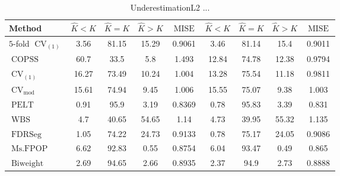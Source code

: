 \begin{table}[ht]
\centering
\begin{tabular}{|l|cccc|cccc|}
  \hline
Method & $\hat{K} < K$ & $\hat{K} = K$ & $\hat{K} > K$ & $\operatorname{MISE}$ & $\hat{K} < K$ & $\hat{K} = K$ & $\hat{K} > K$ & $\operatorname{MISE}$ \\ 
  \hline
$5$-fold $\operatorname{CV}_{(1)}$ &  3.56 & 81.15 & 15.29 & 0.9061 &  3.46 & 81.14 &  15.4 & 0.9011 \\ 
  $\operatorname{COPSS}$ &  60.7 &  33.5 &   5.8 & 1.493 & 12.84 & 74.78 & 12.38 & 0.9794 \\ 
  $\operatorname{CV}_{(1)}$ & 16.27 & 73.49 & 10.24 & 1.004 & 13.28 & 75.54 & 11.18 & 0.9811 \\ 
  $\operatorname{CV}_{\operatorname{mod}}$ & 15.61 & 74.94 &  9.45 & 1.006 & 15.55 & 75.07 &  9.38 & 1.003 \\ 
  $\operatorname{PELT}$ &  0.91 &  95.9 &  3.19 & 0.8369 &  0.78 & 95.83 &  3.39 & 0.831 \\ 
  $\operatorname{WBS}$ &   4.7 & 40.65 & 54.65 &  1.14 &  4.73 & 39.95 & 55.32 & 1.135 \\ 
  $\operatorname{FDRSeg}$ &  1.05 & 74.22 & 24.73 & 0.9133 &  0.78 & 75.17 & 24.05 & 0.9086 \\ 
  $\operatorname{Ms.FPOP}$ &  6.62 & 92.83 &  0.55 & 0.8754 &  6.04 & 93.47 &  0.49 & 0.865 \\ 
  $\operatorname{Biweight}$ &  2.69 & 94.65 &  2.66 & 0.8935 &  2.37 &  94.9 &  2.73 & 0.8888 \\ 
   \hline
\end{tabular}
\caption{UnderestimationL2 ...} 
\end{table}
